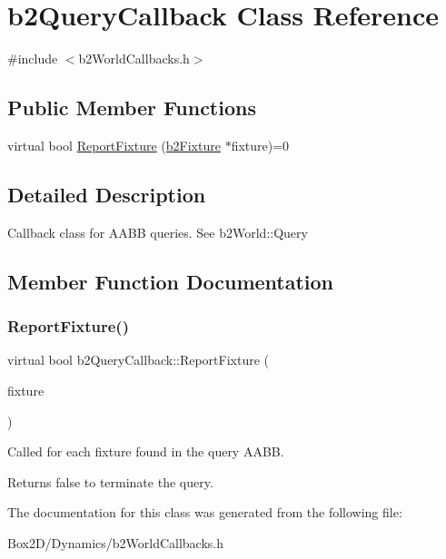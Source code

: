 \hypertarget{classb2_query_callback}{}\section{b2\+Query\+Callback Class Reference}
\label{classb2_query_callback}


{\ttfamily \#include $<$b2\+World\+Callbacks.\+h$>$}

\subsection*{Public Member Functions}
\begin{DoxyCompactItemize}
\item 
virtual bool \hyperlink{classb2_query_callback_a187dd04dd0f5164fb05c2ce2cbfd9ee5}{Report\+Fixture} (\hyperlink{classb2_fixture}{b2\+Fixture} $\ast$fixture)=0
\end{DoxyCompactItemize}


\subsection{Detailed Description}
Callback class for A\+A\+BB queries. See b2\+World\+::\+Query 

\subsection{Member Function Documentation}
\mbox{\label{classb2_query_callback_a187dd04dd0f5164fb05c2ce2cbfd9ee5}} 
\subsubsection{\texorpdfstring{Report\+Fixture()}{ReportFixture()}}
{\footnotesize\ttfamily virtual bool b2\+Query\+Callback\+::\+Report\+Fixture (\begin{DoxyParamCaption}\item[{\hyperlink{classb2_fixture}{b2\+Fixture} $\ast$}]{fixture }\end{DoxyParamCaption})\hspace{0.3cm}{\ttfamily [pure virtual]}}

Called for each fixture found in the query A\+A\+BB. \begin{DoxyReturn}{Returns}
false to terminate the query. 
\end{DoxyReturn}


The documentation for this class was generated from the following file\+:\begin{DoxyCompactItemize}
\item 
Box2\+D/\+Dynamics/b2\+World\+Callbacks.\+h\end{DoxyCompactItemize}

